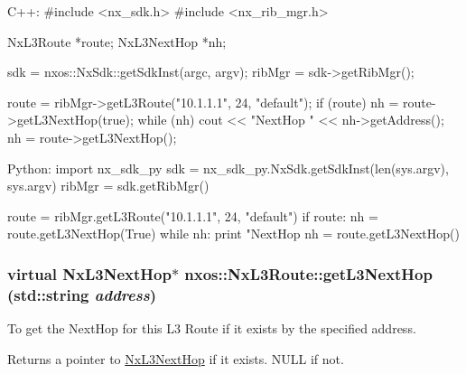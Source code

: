 \begin{DoxyCode}
  C++:
       #include <nx_sdk.h>
       #include <nx_rib_mgr.h>

       NxL3Route    *route;
       NxL3NextHop  *nh;

       sdk = nxos::NxSdk::getSdkInst(argc, argv);
       ribMgr = sdk->getRibMgr();

       route = ribMgr->getL3Route("10.1.1.1", 24, "default");
       if (route) {
           nh = route->getL3NextHop(true);
           while (nh) {
               cout << "NextHop " << nh->getAddress(); 
               nh = route->getL3NextHop();
           }
       }

  Python:
       import nx_sdk_py
       sdk = nx_sdk_py.NxSdk.getSdkInst(len(sys.argv), sys.argv)
       ribMgr = sdk.getRibMgr()

       route = ribMgr.getL3Route("10.1.1.1", 24, "default")
       if route:
          nh = route.getL3NextHop(True)
          while nh:
              print "NextHop %
              nh = route.getL3NextHop()
\end{DoxyCode}
 \hypertarget{classnxos_1_1NxL3Route_a960a2e429fd7514f0d40e64743e04872}{
\subsubsection[{getL3NextHop}]{\setlength{\rightskip}{0pt plus 5cm}virtual {\bf NxL3NextHop}$\ast$ nxos::NxL3Route::getL3NextHop (std::string {\em address})}}
\label{classnxos_1_1NxL3Route_a960a2e429fd7514f0d40e64743e04872}
To get the NextHop for this L3 Route if it exists by the specified address.

\begin{DoxyReturn}{Returns}
a pointer to \hyperlink{classnxos_1_1NxL3NextHop}{NxL3NextHop} if it exists. NULL if not.
\end{DoxyReturn}

